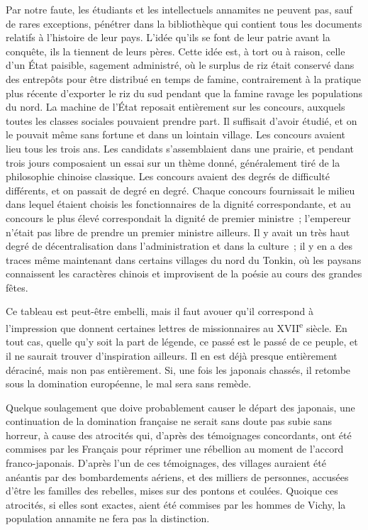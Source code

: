 \documentclass[french,twoside]{book} %
\begin{document}
Par notre faute, les étudiants et les intellectuels annamites ne peuvent pas, sauf de rares exceptions, pénétrer dans la bibliothèque qui contient tous les documents relatifs à l'histoire de leur pays. L'idée qu'ils se font de leur patrie avant la conquête, ils la tiennent de leurs pères. Cette idée est, à tort ou à raison, celle d'un État paisible, sagement administré, où le surplus de riz était conservé dans des entrepôts pour être distribué en temps de famine, contrairement à la pratique plus récente d'exporter le riz du sud pendant que la famine ravage les populations du nord. La machine de l'État reposait entière­ment sur les concours, auxquels toutes les classes sociales pouvaient prendre part. Il suffisait d'avoir étudié, et on le pouvait même sans fortune et dans un lointain village. Les concours avaient lieu tous les trois ans. Les candidats s'assemblaient dans une prairie, et pendant trois jours composaient un essai sur un thème donné, généralement tiré de la philosophie chinoise classique. Les concours avaient des degrés de difficulté différents, et on passait de degré en degré. Chaque concours fournissait le milieu dans lequel étaient choisis les fonctionnaires de la dignité correspondante, et au concours le plus élevé correspondait la dignité de premier ministre ; l'empereur n'était pas libre de prendre un premier ministre ailleurs. Il y avait un très haut degré de décen­tralisation dans l'administration et dans la culture ; il y en a des traces même maintenant dans certains villages du nord du Tonkin, où les paysans connaissent les caractères chinois et improvisent de la poésie au cours des grandes fêtes.\par
Ce tableau est peut-être embelli, mais il faut avouer qu'il correspond à l'impression que donnent certaines lettres de missionnaires au XVII\textsuperscript{e} siècle. En tout cas, quelle qu'y soit la part de légende, ce passé est le passé de ce peuple, et il ne saurait trouver d'inspiration ailleurs. Il en est déjà presque entièrement déraciné, mais non pas entièrement. Si, une fois les japonais chassés, il retombe sous la domination européenne, le mal sera sans remède.\par
Quelque soulagement que doive probablement causer le départ des japo­nais, une continuation de la domination française ne serait sans doute pas subie sans horreur, à cause des atrocités qui, d'après des témoignages concor­dants, ont été commises par les Français pour réprimer une rébellion au moment de l'accord franco-japonais. D'après l'un de ces témoignages, des villages auraient été anéantis par des bombardements aériens, et des milliers de personnes, accusées d'être les familles des rebelles, mises sur des pontons et coulées. Quoique ces atrocités, si elles sont exactes, aient été commises par les hommes de Vichy, la population annamite ne fera pas la distinction.\par
\end{document}
